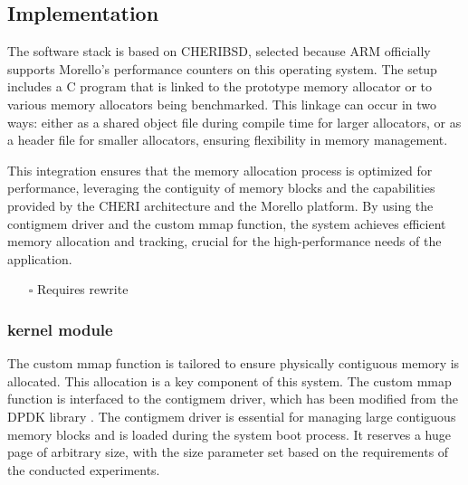 \documentclass[11pt]{article}
\begin{document}
\subsection{Implementation}
\label{sec:orgea27970}
The software stack is based on CHERIBSD, selected because ARM officially supports Morello's performance 
counters on this operating system. The setup includes a C program that 
is linked to the prototype memory allocator or to various memory allocators being benchmarked. This linkage can occur in two ways: either as a shared object file during compile time 
for larger allocators, or as a header file for smaller allocators, ensuring flexibility 
in memory management.

This integration ensures that the memory allocation process is optimized for performance, leveraging the contiguity 
of memory blocks and the capabilities provided by the CHERI architecture and the Morello platform. By using the 
contigmem driver and the custom mmap function, the system achieves efficient memory allocation and tracking, 
crucial for the high-performance needs of the application.

\begin{itemize}
\item[{$\square$}] Requires rewrite
\end{itemize}
\subsubsection{kernel module}
\label{sec:org1d0969e}
The custom mmap function is tailored to ensure physically contiguous memory is allocated. This allocation is a key component 
of this system. The custom mmap function is interfaced to the contigmem driver, which has been modified from the DPDK library 
. The contigmem driver is essential for managing large contiguous 
memory blocks and is loaded during the system boot process. It reserves a huge page of arbitrary size, with the 
size parameter set based on the requirements of the conducted experiments.



\end{document}
